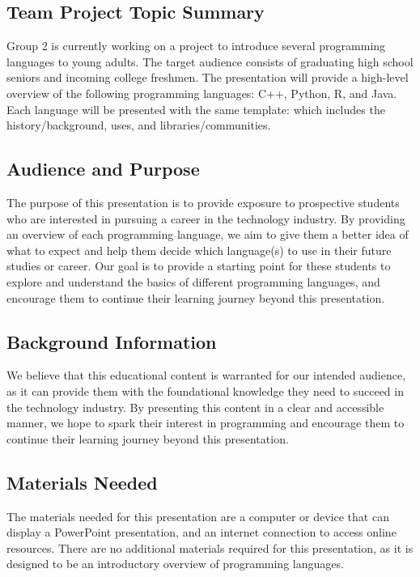 
\subsection{Team Project Topic Summary} 
Group 2 is currently working on a project to introduce several programming languages to young adults. The target audience consists of graduating high school seniors and incoming college freshmen. The presentation will provide a high-level overview of the following programming languages: C++, Python, R, and Java. Each language will be presented with the same template: which includes the history/background, uses, and libraries/communities.

\subsection{Audience and Purpose}
The purpose of this presentation is to provide exposure to prospective students who are interested in pursuing a career in the technology industry. By providing an overview of each programming language, we aim to give them a better idea of what to expect and help them decide which language(s) to use in their future studies or career. Our goal is to provide a starting point for these students to explore and understand the basics of different programming languages, and encourage them to continue their learning journey beyond this presentation.

\subsection{Background Information}
We believe that this educational content is warranted for our intended audience, as it can provide them with the foundational knowledge they need to succeed in the technology industry. By presenting this content in a clear and accessible manner, we hope to spark their interest in programming and encourage them to continue their learning journey beyond this presentation.

\subsection{Materials Needed}
The materials needed for this presentation are a computer or device that can display a PowerPoint presentation, and an internet connection to access online resources. There are no additional materials required for this presentation, as it is designed to be an introductory overview of programming languages. 

